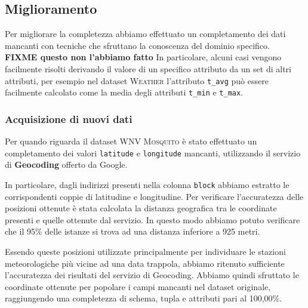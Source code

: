 \subsection{Miglioramento}

Per migliorare la completezza abbiamo effettuato un completamento dei dati 
mancanti con tecniche che sfruttano la conoscenza del dominio specifico.\\
\textbf{FIXME questo non l'abbiamo fatto} In particolare, alcuni casi vengono 
facilmente risolti derivando il valore di un specifico attributo da un set di 
altri attributi, per esempio nel dataset \textsc{Weather} l'attributo 
\texttt{t\_avg} può essere facilmente calcolato come la media degli attributi 
\texttt{t\_min} e \texttt{t\_max}.


\subsubsection{Acquisizione di nuovi dati}
Per quando riguarda il dataset \textsc{WNV Mosquito} è stato effettuato un 
completamento dei valori \texttt{latitude} e \texttt{longitude} mancanti, 
utilizzando il servizio di \textbf{Geocoding} offerto da Google.

In particolare, dagli indirizzi presenti nella colonna \texttt{block} abbiamo 
estratto le corrispondenti coppie di latitudine e longitudine. 
Per verificare l'accuratezza delle posizioni ottenute è stata calcolata la 
distanza geografica tra le coordinate presenti e quelle ottenute dal servizio. 
In questo modo abbiamo potuto verificare che il 95\% delle istanze si trova ad 
una distanza inferiore a 925 metri.

Essendo queste posizioni utilizzate principalmente per individuare le stazioni 
meteorologiche più vicine ad una data trappola, abbiamo ritenuto sufficiente 
l'accuratezza dei risultati del servizio di Geocoding. Abbiamo quindi sfruttato 
le coordinate ottenute per popolare i campi mancanti nel dataset originale, 
raggiungendo una completezza di schema, tupla e attributi pari al 100,00\%.

